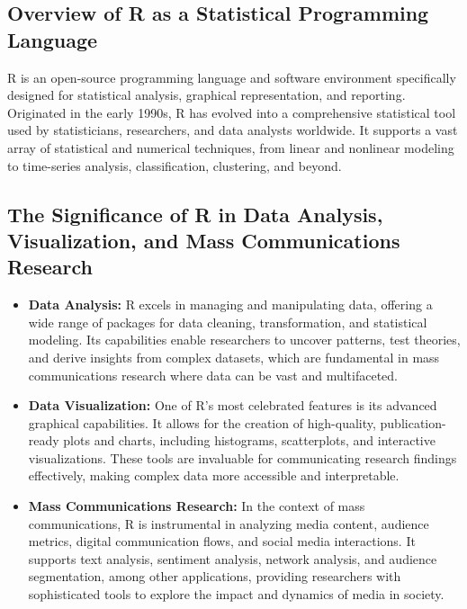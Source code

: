 \documentclass[
]{book}
\begin{document}
\hypertarget{overview-of-r-as-a-statistical-programming-language}{%
\subsection*{Overview of R as a Statistical Programming Language}\label{overview-of-r-as-a-statistical-programming-language}}

R is an open-source programming language and software environment specifically designed for statistical analysis, graphical representation, and reporting. Originated in the early 1990s, R has evolved into a comprehensive statistical tool used by statisticians, researchers, and data analysts worldwide. It supports a vast array of statistical and numerical techniques, from linear and nonlinear modeling to time-series analysis, classification, clustering, and beyond.

\hypertarget{the-significance-of-r-in-data-analysis-visualization-and-mass-communications-research}{%
\subsection*{The Significance of R in Data Analysis, Visualization, and Mass Communications Research}\label{the-significance-of-r-in-data-analysis-visualization-and-mass-communications-research}}

\begin{itemize}
\item
  \textbf{Data Analysis:} R excels in managing and manipulating data, offering a wide range of packages for data cleaning, transformation, and statistical modeling. Its capabilities enable researchers to uncover patterns, test theories, and derive insights from complex datasets, which are fundamental in mass communications research where data can be vast and multifaceted.
\item
  \textbf{Data Visualization:} One of R's most celebrated features is its advanced graphical capabilities. It allows for the creation of high-quality, publication-ready plots and charts, including histograms, scatterplots, and interactive visualizations. These tools are invaluable for communicating research findings effectively, making complex data more accessible and interpretable.
\item
  \textbf{Mass Communications Research:} In the context of mass communications, R is instrumental in analyzing media content, audience metrics, digital communication flows, and social media interactions. It supports text analysis, sentiment analysis, network analysis, and audience segmentation, among other applications, providing researchers with sophisticated tools to explore the impact and dynamics of media in society.
\end{itemize}
\end{document}
